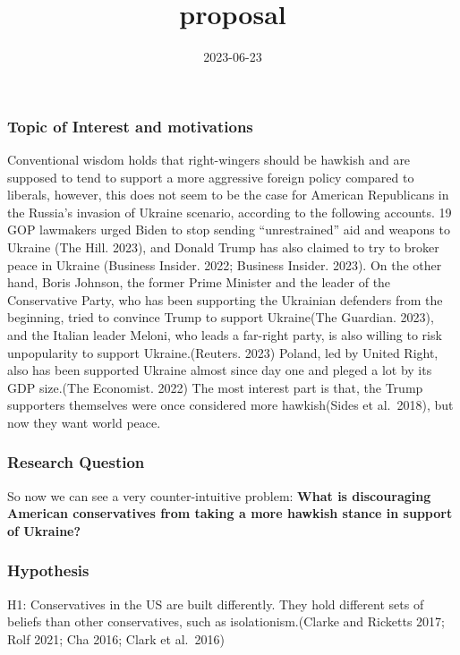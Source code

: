 \documentclass[
]{article}
\title{proposal}
\author{}
\date{\vspace{-2.5em}2023-06-23}
\begin{document}
\maketitle

\hypertarget{topic-of-interest-and-motivations}{%
\subsubsection{Topic of Interest and
motivations}\label{topic-of-interest-and-motivations}}

Conventional wisdom holds that right-wingers should be hawkish and are
supposed to tend to support a more aggressive foreign policy compared to
liberals, however, this does not seem to be the case for American
Republicans in the Russia's invasion of Ukraine scenario, according to
the following accounts. 19 GOP lawmakers urged Biden to stop sending
``unrestrained'' aid and weapons to Ukraine (The Hill. 2023), and Donald
Trump has also claimed to try to broker peace in Ukraine (Business
Insider. 2022; Business Insider. 2023). On the other hand, Boris
Johnson, the former Prime Minister and the leader of the Conservative
Party, who has been supporting the Ukrainian defenders from the
beginning, tried to convince Trump to support Ukraine(The Guardian.
2023), and the Italian leader Meloni, who leads a far-right party, is
also willing to risk unpopularity to support Ukraine.(Reuters. 2023)
Poland, led by United Right, also has been supported Ukraine almost
since day one and pleged a lot by its GDP size.(The Economist. 2022) The
most interest part is that, the Trump supporters themselves were once
considered more hawkish(Sides et al.~2018), but now they want world
peace.

\hypertarget{research-question}{%
\subsubsection{Research Question}\label{research-question}}

So now we can see a very counter-intuitive problem: \textbf{What is
discouraging American conservatives from taking a more hawkish stance in
support of Ukraine?}

\hypertarget{hypothesis}{%
\subsubsection{Hypothesis}\label{hypothesis}}

H1: Conservatives in the US are built differently. They hold different
sets of beliefs than other conservatives, such as isolationism.(Clarke
and Ricketts 2017; Rolf 2021; Cha 2016; Clark et al.~2016)
\end{document}
